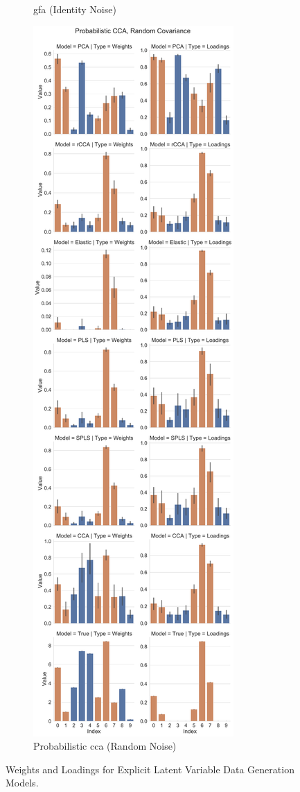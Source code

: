 \begin{figure}
\begin{subfigure}{0.49\linewidth}
\caption{\acrshort{gfa} (Identity Noise)}
\end{subfigure}
%
\begin{subfigure}{0.49\linewidth}
\centering
\includegraphics[width=\linewidth]{figures/simulated/low/Combined_Weights_Loadings_with_Error_Bars_Random_Covariance_explicit}
\caption{Probabilistic \acrshort{cca} (Random Noise)}
\end{subfigure}
\caption{Weights and Loadings for Explicit Latent Variable Data Generation Models.}\label{fig:latent-variable-weights-loadings}
\end{figure}

